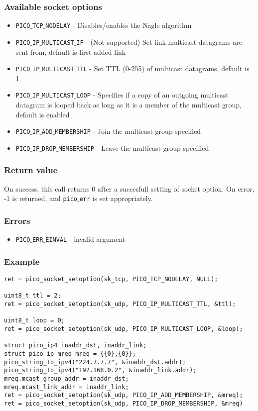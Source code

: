 \subsubsection*{Available socket options}
\begin{itemize}[noitemsep]
\item \texttt{PICO$\_$TCP$\_$NODELAY} - Disables/enables the Nagle algorithm
\item \texttt{PICO$\_$IP$\_$MULTICAST$\_$IF} - (Not supported) Set link multicast datagrams are sent from, default is first added link
\item \texttt{PICO$\_$IP$\_$MULTICAST$\_$TTL} - Set TTL (0-255) of multicast datagrams, default is 1
\item \texttt{PICO$\_$IP$\_$MULTICAST$\_$LOOP} - Specifies if a copy of an outgoing multicast datagram is looped back as long as it is a member of the multicast group, default is enabled
\item \texttt{PICO$\_$IP$\_$ADD$\_$MEMBERSHIP} - Join the multicast group specified
\item \texttt{PICO$\_$IP$\_$DROP$\_$MEMBERSHIP} - Leave the multicast group specified
\end{itemize}

\subsubsection*{Return value}
On success, this call returns 0 after a succesfull setting of socket option.
On error, -1 is returned, and \texttt{pico$\_$err} is set appropriately.

\subsubsection*{Errors}
\begin{itemize}[noitemsep]
\item \texttt{PICO$\_$ERR$\_$EINVAL} - invalid argument
\end{itemize}

\subsubsection*{Example}
\begin{verbatim}
ret = pico_socket_setoption(sk_tcp, PICO_TCP_NODELAY, NULL);

uint8_t ttl = 2;
ret = pico_socket_setoption(sk_udp, PICO_IP_MULTICAST_TTL, &ttl);

uint8_t loop = 0;
ret = pico_socket_setoption(sk_udp, PICO_IP_MULTICAST_LOOP, &loop);

struct pico_ip4 inaddr_dst, inaddr_link;
struct pico_ip_mreq mreq = {{0},{0}};
pico_string_to_ipv4("224.7.7.7", &inaddr_dst.addr);
pico_string_to_ipv4("192.168.0.2", &inaddr_link.addr);
mreq.mcast_group_addr = inaddr_dst;
mreq.mcast_link_addr = inaddr_link;
ret = pico_socket_setoption(sk_udp, PICO_IP_ADD_MEMBERSHIP, &mreq);
ret = pico_socket_setoption(sk_udp, PICO_IP_DROP_MEMBERSHIP, &mreq)
\end{verbatim}


